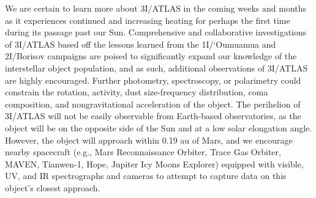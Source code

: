 \documentclass[linenumbers,twocolumn,longbib]{aastex7}
\begin{document}
We are certain to learn more about 3I/ATLAS in the coming weeks and months as it experiences continued and increasing heating for perhaps the first time during its passage past our Sun. Comprehensive and collaborative investigations of 3I/ATLAS based off the lessons learned from the 1I/`Oumuamua and 2I/Borisov campaigns are poised to significantly expand our knowledge of the interstellar object population, and as such, additional observations of 3I/ATLAS are highly encouraged.  Further photometry, spectroscopy, or polarimetry could constrain the rotation, activity, dust size-frequency distribution, coma composition, and nongravitational acceleration of the object. The perihelion of 3I/ATLAS will not be easily observable from Earth-based observatories, as the object will be on the opposite side of the Sun and at a low solar elongation angle. However, the object will approach within 0.19 au of Mars, and we encourage nearby spacecraft (e.g., Mars Reconnaissance Orbiter, Trace Gas Orbiter, MAVEN, Tianwen-1, Hope, Jupiter Icy Moons Explorer) equipped with visible, UV, and IR spectrographs and cameras to attempt to capture data on this object's closest approach.
\end{document}
